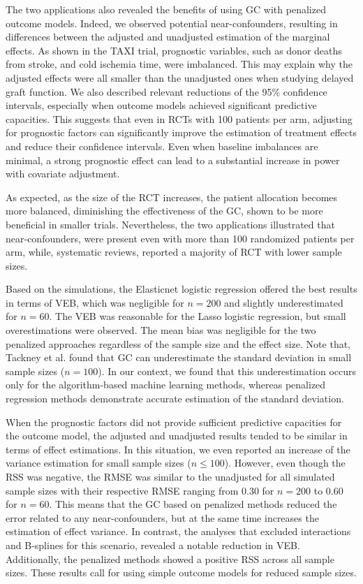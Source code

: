 \documentclass{article}
\begin{document}
The two applications also revealed the benefits of using GC with penalized outcome models. Indeed, we observed potential near-confounders, resulting in differences between the adjusted and unadjusted estimation of the marginal effects. As shown in the TAXI trial, prognostic variables, such as donor deaths from stroke, and cold ischemia time, were imbalanced. This may explain why the adjusted effects were all  smaller than the unadjusted ones when studying delayed graft function. We also described relevant reductions of the 95\% confidence intervals, especially when outcome models achieved significant predictive capacities. This suggests that even in RCTs with 100 patients per arm, adjusting for prognostic factors can significantly improve the estimation of treatment effects and reduce their confidence intervals. Even when baseline imbalances are minimal, a strong prognostic effect can lead to a substantial increase in power with covariate adjustment.\cite{steyerberg_clinical_2000,pocock_subgroup_2002}


As expected, as the size of the RCT increases, the patient allocation becomes more balanced, diminishing the effectiveness of the GC, shown to be more beneficial in smaller trials. Nevertheless, the two applications illustrated that near-confounders, were present even with more than 100 randomized patients per arm, while, systematic reviews, \cite{robinson_characteristics_2021, anthon_overall_2019} reported a majority of RCT with lower sample sizes.



Based on the simulations, the Elasticnet logistic regression offered the best results in terms of VEB, which was negligible for $n=200$ and slightly underestimated for $n=60$. The VEB was reasonable for the Lasso logistic regression, but small overestimations were observed. The mean bias was negligible for the two penalized approaches regardless of the sample size and the effect size. Note that, Tackney et al.\cite{tackney_comparison_2023} found that GC can underestimate the standard deviation in small sample sizes ($n=100$). In our context, we found that this underestimation occurs only for the algorithm-based machine learning methods, whereas penalized regression methods demonstrate accurate estimation of the standard deviation. 

When the prognostic factors did not provide sufficient predictive capacities for the outcome model, the adjusted and unadjusted results tended to be similar in terms of effect estimations. In this situation, we even reported an increase of the variance estimation for small sample sizes ($n\leq 100$). However, even though the RSS was negative, the RMSE was similar to the unadjusted for all simulated sample sizes with their respective RMSE ranging from 0.30 for $n=200$ to 0.60 for $n=60$. This means that the GC based on penalized methods reduced the error related to any near-confounders, but at the same time increases the estimation of effect variance. 
In contrast, the analyses that excluded interactions and B-splines for this scenario, revealed a notable reduction in VEB. Additionally, the penalized methods showed a positive RSS across all sample sizes. These results call for using simple outcome models for reduced sample sizes.
\end{document}

